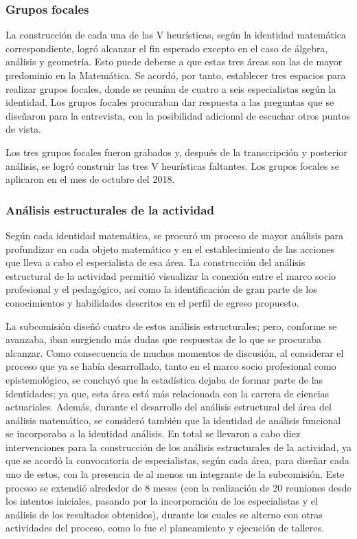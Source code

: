 \subsubsection{Grupos focales}

La construcción de cada una de las V heurísticas, según la identidad matemática correspondiente, logró alcanzar el fin esperado excepto en el caso de álgebra, análisis y geometría. Esto puede deberse a que estas tres áreas son las de mayor predominio en la Matemática. Se acordó, por tanto, establecer tres espacios para realizar grupos focales, donde se reunían de cuatro a seis especialistas según la identidad. Los grupos focales procuraban dar respuesta a las preguntas que se diseñaron para la entrevista, con la posibilidad adicional de escuchar otros puntos de vista.

Los tres grupos focales fueron grabados y, después de la transcripción y posterior análisis, se logró construir las tres V heurísticas faltantes. Los grupos focales se aplicaron en el mes de octubre del 2018. 

\subsubsection{Análisis estructurales de la actividad}

Según cada identidad matemática, se procuró un proceso de mayor análisis para profundizar en cada objeto matemático y en el establecimiento de las acciones que lleva a cabo el especialista de esa área. La construcción del análisis estructural de la actividad permitió visualizar la conexión entre el marco socio profesional y el pedagógico, así como la identificación de gran parte de los conocimientos y habilidades descritos en el perfil de egreso propuesto. 

La subcomisión diseñó cuatro de estos análisis estructurales; pero, conforme se avanzaba, iban surgiendo más dudas que respuestas de lo que se procuraba alcanzar. Como consecuencia de
muchos momentos de discusión, al considerar el proceso que ya se había desarrollado, tanto en el marco socio profesional como epistemológico, se concluyó que la estadística dejaba de formar parte de las identidades; ya que, esta área está más relacionada con la carrera de ciencias actuariales. Además, durante el desarrollo del análisis estructural del área del análisis matemático, se consideró también que la identidad de análisis funcional se incorporaba a la identidad análisis. En total se llevaron a cabo diez intervenciones para la construcción de los análisis estructurales de la actividad, ya que se acordó la convocatoria de especialistas, según cada área, para diseñar cada uno de estos, con la presencia de al menos un integrante de la subcomisión. Este proceso se extendió alrededor de 8 meses (con la realización de 20 reuniones desde los intentos iniciales, pasando por la incorporación de los especialistas y el análisis de los resultados obtenidos), durante los cuales se alterno con otras actividades del proceso, como lo fue el planeamiento y ejecución de talleres. 


